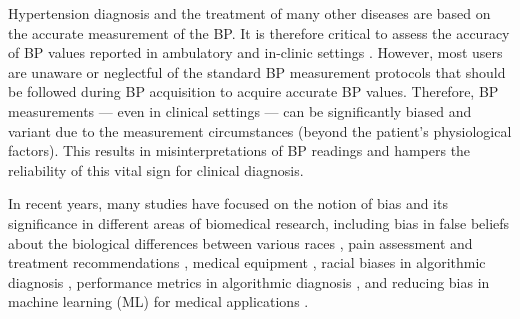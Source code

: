 \documentclass[journal,article,moreauthors]{Definitions/mdpi}
\begin{document}
Hypertension diagnosis and the treatment of many other diseases are based on the accurate measurement of the BP. It is therefore critical to assess the accuracy of BP values reported in ambulatory and in-clinic settings \citep{ding2016continuous, Sewell2016-lp}. However, most users are unaware or neglectful of the standard BP measurement protocols that should be followed during BP acquisition to acquire accurate BP values. Therefore, BP measurements --- even in clinical settings --- can be significantly biased and variant due to the measurement circumstances (beyond the patient's physiological factors). This results in misinterpretations of BP readings and hampers the reliability of this vital sign for clinical diagnosis.



In recent years, many studies have focused on the notion of bias and its significance in different areas of biomedical research, including bias in false beliefs about the biological differences between various races \citep{Hoffman2016-km}, pain assessment and treatment recommendations \citep{Lee2019-fm}, medical equipment \citep{Valbuena2022-gw}, racial biases in algorithmic diagnosis \citep{Obermeyer2019-cb}, performance metrics in algorithmic diagnosis \citep{Reyna2022-on}, and reducing bias in machine learning (ML) for medical applications \citep{Vokinger2021-td}.
\end{document}
